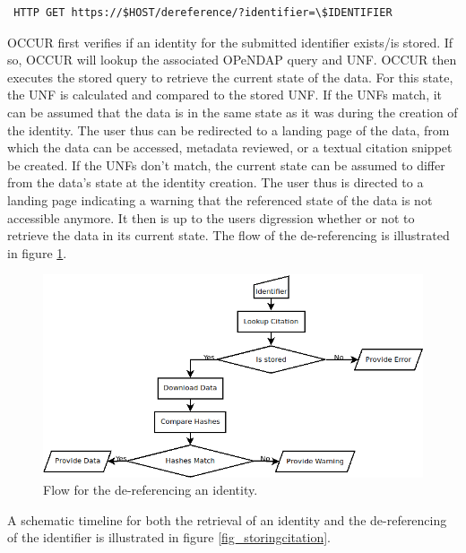 \documentclass[letterpaper, twocolumn, parskip=half, fontsize=8pt, DIV=calc]{scrartcl}
\begin{document}
\begin{lstlisting}
 HTTP GET https://$HOST/dereference/?identifier=\$IDENTIFIER
\end{lstlisting}

OCCUR first verifies if an identity for the submitted identifier exists/is stored. If so, OCCUR will lookup the associated OPeNDAP query and \gls{UNF}. OCCUR then executes the stored query to retrieve the current state of the data. For this state, the UNF is calculated and compared to the stored UNF. If the UNFs match, it can be assumed that the data is in the same state as it was during the creation of the identity. The user thus can be redirected to a landing page of the data, from which the data can be accessed, metadata reviewed, or a textual citation snippet be created.
If the UNFs don't match, the current state can be assumed to differ from the data's state at the identity creation. The user thus is directed to a landing page indicating a warning that the referenced state of the data is not accessible anymore. It then is up to the users digression whether or not to retrieve the data in its current state. The flow of the de-referencing is illustrated in figure \ref{fig_dereference}.

\begin{figure}[ht]
 \includegraphics[width=\columnwidth]{figures/dereference.png}
 \caption{Flow for the de-referencing an identity.}
 \label{fig_dereference}
\end{figure}

A schematic timeline for both the retrieval of an identity and the de-referencing of the identifier is illustrated in figure \ref{fig_storingcitation}.
\end{document}
